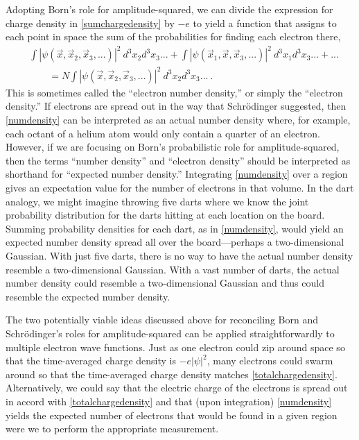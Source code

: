 \documentclass[onecolumn,secnumarabic,amsmath,amssymb,balancelastpage,nofootinbib]{article}
\begin{document}
Adopting Born's role for amplitude-squared, we can divide the expression for charge density in \eqref{sumchargedensity} by $-e$ to yield a function that assigns to each point in space the sum of the probabilities for finding each electron there,
\begin{align}
&\int{|\psi(\vec{x},\vec{x}_2, \vec{x}_3, ...)|^2 \ d^3 x_2 d^3 x_3 ...} + \int{|\psi(\vec{x}_1,\vec{x}, \vec{x}_3, ...)|^2 \ d^3 x_1 d^3 x_3 ...}+ ...
\nonumber
\\
&\quad\quad = N \int{|\psi(\vec{x},\vec{x}_2, \vec{x}_3, ...)|^2 \ d^3 x_2 d^3 x_3 ...}
\ .
\label{numdensity}
\end{align}
This is sometimes called the ``electron number density,'' or simply the ``electron density.''  If electrons are spread out in the way that Schr\"{o}dinger suggested, then \eqref{numdensity} can be interpreted as an actual number density where, for example, each octant of a helium atom would only contain a quarter of an electron.  However, if we are focusing on Born's probabilistic role for amplitude-squared, then the terms ``number density'' and ``electron density'' should be interpreted as shorthand for ``expected number density.''  Integrating \eqref{numdensity} over a region gives an expectation value for the number of electrons in that volume.  In the dart analogy, we might imagine throwing five darts where we know the joint probability distribution for the darts hitting at each location on the board.  Summing probability densities for each dart, as in \eqref{numdensity}, would yield an expected number density spread all over the board---perhaps a two-dimensional Gaussian.  With just five darts, there is no way to have the actual number density resemble a two-dimensional Gaussian.  With a vast number of darts, the actual number density could resemble a two-dimensional Gaussian and thus could resemble the expected number density.

The two potentially viable ideas discussed above for reconciling Born and Schr\"{o}dinger's roles for amplitude-squared can be applied straightforwardly to multiple electron wave functions.  Just as one electron could zip around space so that the time-averaged charge density is $-e|\psi|^2$, many electrons could swarm around so that the time-averaged charge density matches \eqref{totalchargedensity}.  Alternatively, we could say that the electric charge of the electrons is spread out in accord with \eqref{totalchargedensity} and that (upon integration) \eqref{numdensity} yields the expected number of electrons that would be found in a given region were we to perform the appropriate measurement.
\end{document}
